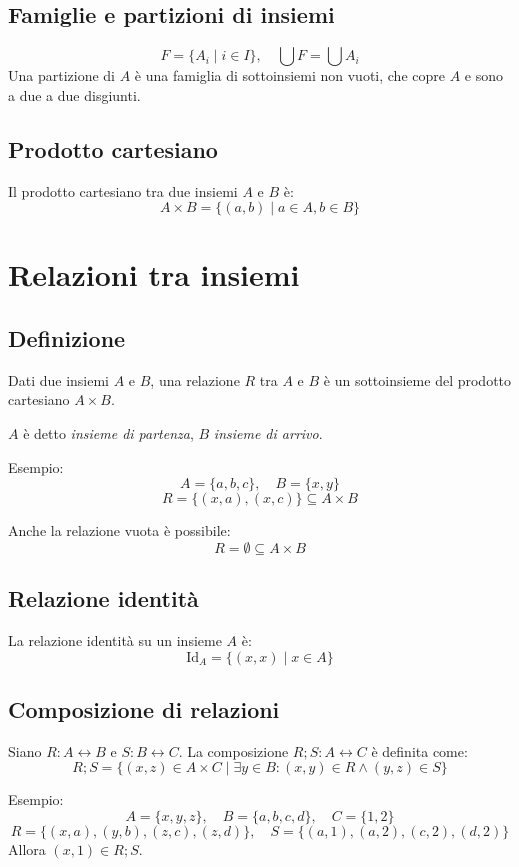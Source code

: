 \documentclass[a4paper,12pt]{article}
\let\oldsection\section
\renewcommand{\section}{\clearpage\oldsection}
\begin{document}
\subsection{Famiglie e partizioni di insiemi}
\[
F = \{ A_i \mid i \in I \}, \quad \bigcup F = \bigcup A_i
\]  
Una partizione di $A$ è una famiglia di sottoinsiemi non vuoti, che copre $A$ e sono a due a due disgiunti.

\subsection{Prodotto cartesiano}
Il prodotto cartesiano tra due insiemi $A$ e $B$ è:
\[
A \times B = \{ (a,b) \mid a \in A, b \in B \}
\]

\section{Relazioni tra insiemi}

\subsection{Definizione}
Dati due insiemi $A$ e $B$, una relazione $R$ tra $A$ e $B$ è un sottoinsieme del prodotto cartesiano $A \times B$.  

$A$ è detto \textit{insieme di partenza}, $B$ \textit{insieme di arrivo}.  

Esempio: 
\[
A = \{a,b,c\}, \quad B = \{x,y\}
\] 
\[
R = \{(x,a),(x,c)\} \subseteq A \times B
\] 

Anche la relazione vuota è possibile: 
\[
R = \emptyset \subseteq A \times B
\]

\subsection{Relazione identità}
La relazione identità su un insieme $A$ è: 
\[
\text{Id}_A = \{(x,x) \mid x \in A\}
\]

\subsection{Composizione di relazioni}
Siano $R: A \leftrightarrow B$ e $S: B \leftrightarrow C$.  
La composizione $R;S: A \leftrightarrow C$ è definita come:
\[
R;S = \{(x,z) \in A \times C \mid \exists y \in B : (x,y) \in R \wedge (y,z) \in S \}
\]

Esempio:  
\[
A = \{x,y,z\}, \quad B = \{a,b,c,d\}, \quad C = \{1,2\}
\]  
\[
R = \{(x,a),(y,b),(z,c),(z,d)\}, \quad S = \{(a,1),(a,2),(c,2),(d,2)\}
\]  
Allora $(x,1) \in R;S$.
\end{document}
